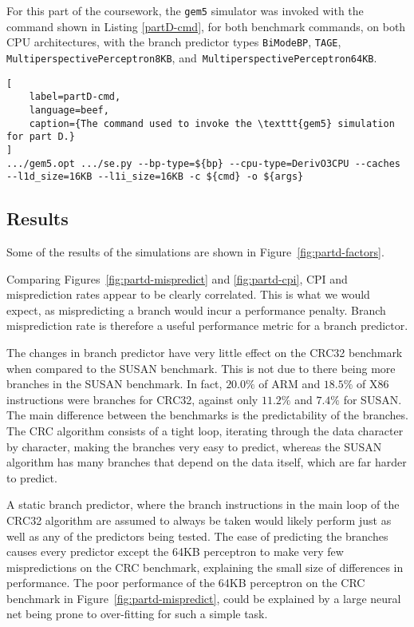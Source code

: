 For this part of the coursework, the \texttt{gem5} simulator was invoked with the
command shown in Listing \ref{partD-cmd},
for both benchmark commands, on both CPU architectures, with the branch
predictor types \texttt{BiModeBP}, \texttt{TAGE},
\texttt{MultiperspectivePerceptron8KB},
and~\texttt{MultiperspectivePerceptron64KB}.


\begin{lstlisting}[
    label=partD-cmd,
    language=beef,
    caption={The command used to invoke the \texttt{gem5} simulation for part D.}
]
.../gem5.opt .../se.py --bp-type=${bp} --cpu-type=DerivO3CPU --caches --l1d_size=16KB --l1i_size=16KB -c ${cmd} -o ${args}
\end{lstlisting}

\subsection{Results}

Some of the results of the simulations are shown in Figure~\ref{fig:partd-factors}.

Comparing Figures~\ref{fig:partd-mispredict} and \ref{fig:partd-cpi}, CPI and
misprediction rates appear to be clearly correlated. This is what we would expect, as
mispredicting a branch would incur a performance penalty. Branch misprediction rate is
therefore a useful performance metric for a branch predictor.

The changes in branch predictor have very little effect on the CRC32
benchmark when compared to the SUSAN benchmark. This is not due to there being more
branches in the SUSAN benchmark. In fact, \(20.0\%\) of ARM and \(18.5\%\) of X86
instructions were branches for CRC32, against only \(11.2\%\) and \(7.4\%\) for SUSAN.
The main difference between the benchmarks is the predictability of the branches.
The CRC algorithm
consists of a tight loop, iterating through the data character by character,
making the branches very easy to predict, whereas the SUSAN algorithm has
many branches that depend on the data itself, which are far harder to predict.

A static branch predictor, where the branch instructions in the main loop of the CRC32
algorithm are assumed to always be taken would likely perform just as well as any of
the predictors being tested.
The ease of predicting the branches causes every predictor except the 64KB perceptron
to make very few mispredictions on the CRC benchmark, explaining the small size of
differences in performance.
The poor performance of the 64KB perceptron
on the CRC benchmark in Figure~\ref{fig:partd-mispredict}, could be explained
by a large neural net being prone to over-fitting for such a simple task.~\cite{Engin2004,Culpepper2005}

